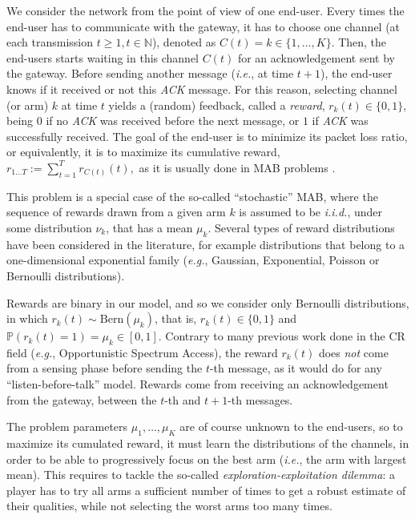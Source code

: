 We consider the network from the point of view of one end-user. Every times the end-user has to communicate with the gateway,
it has to choose one channel (at each transmission $t \geq 1, t \in \mathbb{N}$), denoted as $C(t) = k \in\{1,\dots,K\}$.
Then, the end-users starts waiting in this channel $C(t)$ for an acknowledgement sent by the gateway.
Before sending another message (\emph{i.e.}, at time $t+1$), the end-user knows if it received or not this \emph{ACK} message.
%
For this reason, selecting channel (or arm) $k$ at time $t$ yields a (random) feedback, called a \emph{reward}, $r_k(t) \in \{0,1\}$, being $0$ if no \emph{ACK} was received before the next message, or $1$ if \emph{ACK} was successfully received.
The goal of the end-user is to minimize its packet loss ratio, or equivalently, it is to maximize its cumulative reward,
$r_{1 \dots T} := \sum_{t = 1}^T r_{C(t)}(t),$
as it is usually done in MAB problems \cite{Thompson33,Robbins52,LaiRobbins85}.

This problem is a special case of the so-called ``stochastic'' MAB, where the sequence of rewards drawn from a given arm $k$ is assumed to be  \emph{i.i.d.}, under some distribution $\nu_k$, that has a mean $\mu_k$. Several types of reward distributions have been considered in the literature, for example distributions that belong to a one-dimensional exponential family (\emph{e.g.}, Gaussian, Exponential, Poisson or Bernoulli distributions).

Rewards are binary in our model, and so we consider only Bernoulli distributions, in which $r_k(t) \sim \mathrm{Bern}(\mu_k)$, that is, $r_k(t) \in \{0,1\}$ and $\mathbb{P}(r_k(t) = 1) = \mu_k \in [0,1]$.
Contrary to many previous work done in the CR field (\emph{e.g.}, Opportunistic Spectrum Access),
the reward $r_k(t)$ does \emph{not} come from a sensing phase before sending the $t$-th message, as it would do for any ``listen-before-talk'' model. Rewards come from receiving an acknowledgement from the gateway, between the $t$-th and $t+1$-th messages.

The problem parameters $\mu_1,\dots,\mu_K$ are of course unknown to the end-users, so to maximize its cumulated reward, it must learn the distributions of the channels, in order to be able to progressively focus on the best arm (\emph{i.e.}, the arm with largest mean).
%
This requires to tackle the so-called \emph{exploration-exploitation dilemma}: a player has to try all arms a sufficient number of times to get a robust estimate of their qualities, while not selecting the worst arms too many times.

